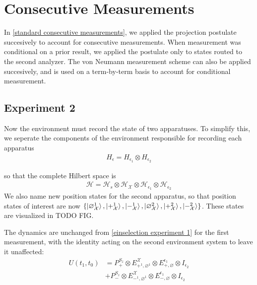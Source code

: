 \section{Consecutive Measurements}

In \autoref{standard consecutive measurements}, we applied the projection postulate succesively to account for consecutive measurements. When measurement was conditional on a prior result, we applied the postulate only to states routed to the second analyzer. The von Neumann measurement scheme can also be applied succesively, and is used on a term-by-term basis to account for conditional measurement.

\subsection{Experiment 2}
Now the environment must record the state of two apparatuses. To simplify this, we seperate the components of the environment responsible for recording each apparatus
\begin{align}
  H_\epsilon = H_{\epsilon_1} \otimes H_{\epsilon_2}
\end{align}

so that the complete Hilbert space is
\begin{align}
  \mathcal{H} = \mathcal{H}_s \otimes \mathcal{H}_\mathcal{X} \otimes \mathcal{H}_{\epsilon_1} \otimes \mathcal{H}_{\epsilon_2}
\end{align}
We also name new position states for the second apparatus, so that position states of interest are now $\{ \ket{\varnothing_{\mathcal{X}}^1}, \ket{+_{\mathcal{X}}^1}, \ket{-_{\mathcal{X}}^1}, \ket{\varnothing_{\mathcal{X}}^2}, \ket{+_{\mathcal{X}}^2}, \ket{-_{\mathcal{X}}^2} \}$. These states are visualized in TODO FIG.

The dynamics are unchanged from \autoref{einselection experiment 1} for the first measurement, with the identity acting on the second environment system to leave it unaffected:
\begin{align}
  U(t_1, t_0) &= P^{S_z}_+ \otimes E^{\mathcal{X}}_{+^1, \varnothing^1}  \nonumber \otimes E^{\epsilon_1}_{+, \varnothing} \otimes I_{\epsilon_2}\\ \nonumber
  &+ P^{S_z}_- \otimes E^{\mathcal{X}}_{-^1, \varnothing^1} \otimes E^{\epsilon_1}_{-,\varnothing} \otimes I_{\epsilon_2}
\end{align}

